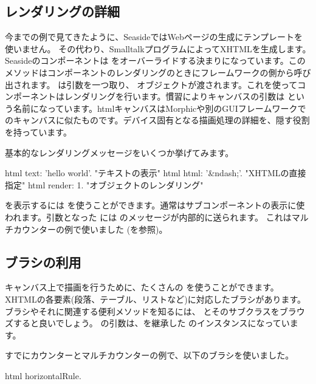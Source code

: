 \documentclass[a4paper,10pt,twoside]{book}
\begin{document}
\subsection{レンダリングの詳細}

今までの例で見てきたように、SeasideではWebページの生成にテンプレートを使いません。
その代わり、SmalltalkプログラムによってXHTMLを生成します。
Seasideのコンポーネントは  をオーバーライドする決まりになっています。このメソッドはコンポーネントのレンダリングのときにフレームワークの側から呼び出されます。
 は引数を一つ取り、  オブジェクトが渡されます。これを使ってコンポーネントはレンダリングを行います。慣習によりキャンバスの引数は  という名前になっています。htmlキャンバスはMorphicや別のGUIフレームワークでのキャンバスに似たものです。デバイス固有となる描画処理の詳細を、隠す役割を持っています。

基本的なレンダリングメッセージをいくつか挙げてみます。
\begin{code}{}
html text: 'hello world'.  "テキストの表示"
html html: '&ndash;'.     "XHTMLの直接指定"
html render: 1.              "オブジェクトのレンダリング"
\end{code}

を表示するには  を使うことができます。通常はサブコンポーネントの表示に使われます。引数となった には のメッセージが内部的に送られます。
これはマルチカウンターの例で使いました (を参照)。

\subsection{ブラシの利用}

キャンバス上で描画を行うために、たくさんの  を使うことができます。
XHTMLの各要素(段落、テーブル、リストなど)に対応したブラシがあります。
ブラシやそれに関連する便利メソッドを知るには、 とそのサブクラスをブラウズすると良いでしょう。
  の引数は、を継承した のインスタンスになっています。

すでにカウンターとマルチカウンターの例で、以下のブラシを使いました。
\begin{code}{}
html horizontalRule.
\end{code}
\end{document}
